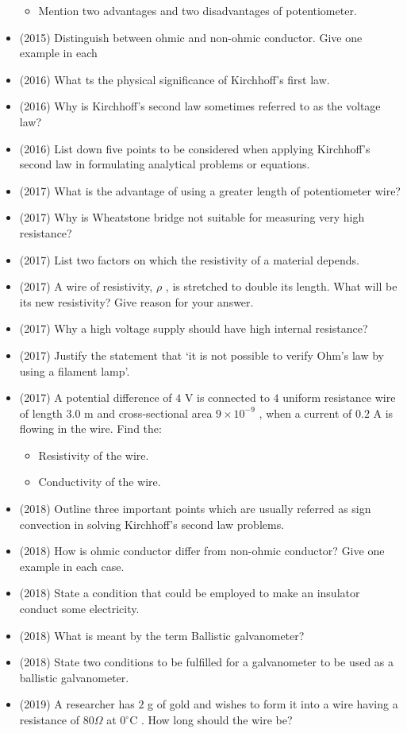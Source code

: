 \documentclass{article}
\begin{document}
\begin{itemize}
\begin{itemize}
\item Mention two advantages and two disadvantages of potentiometer.
\end{itemize}
\item (2015)  Distinguish between ohmic and non-ohmic conductor. Give one example in each
\item (2016)  What ts the physical significance of Kirchhoff’s first law.
\item (2016)  Why is Kirchhoff’s second law sometimes referred to as the voltage law?
\item (2016)  List down five points to be considered when applying Kirchhoff’s second law in formulating analytical problems or equations.
\item (2017)  What is the advantage of using a greater length of potentiometer wire?
\item (2017)  Why is Wheatstone bridge not suitable for measuring very high resistance?
\item (2017)  List two factors on which the resistivity of a material depends. 
\item (2017)  A wire of resistivity, $ \rho $ , is stretched to double its length. What will be its new resistivity? Give reason for your answer. 
\item (2017)  Why a high voltage supply should have high internal resistance?
\item (2017)  Justify the statement that ‘it is not possible to verify Ohm's law by using a filament lamp’.
\item (2017)  A potential difference of $ 4$ V is connected to $ 4$ uniform resistance wire of length $ 3.0$ m and cross-sectional area $ 9\times 10^{-9}$ , when a current of $ 0.2$ A is flowing in the wire. Find the:\begin{itemize}
\item Resistivity of the wire.
\item Conductivity of the wire. 
\end{itemize}
\item (2018)  Outline three important points which are usually referred as sign convection in  solving Kirchhoff’s second law problems. 
\item (2018)  How is ohmic conductor differ from non-ohmic conductor? Give one example in each case. 
\item (2018)  State a condition that could be employed to make an insulator conduct some electricity. 
\item (2018)  What is meant by the term Ballistic galvanometer? 
\item (2018)  State two conditions to be fulfilled for a galvanometer to be used as a ballistic galvanometer. 
\item (2019)  A researcher has $ 2$ g of gold and wishes to form it into a wire having a resistance of $ 80\Omega $ at $ 0^{\circ}$C . How long should the wire be? 
\end{itemize}
\end{document}
